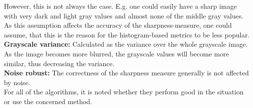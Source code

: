 However, this is not always the case. E.g. one could easily have a sharp image with very dark and light gray values and almost none of the middle gray values.\\
As this assumption affects the accuracy of the sharpness-measure, one could assume, that this is the reason for the histogram-based metrics to be less popular.\\
\textbf{Grayscale variance:} Calculated as the variance over the whole grayscale image. As the image becomes more blurred, the grayscale values will become more similar, thus decreasing the variance.\\
\textbf{Noise robust:}
The correctness of the sharpness measure generally is not affected by noise.\\

For all of the algorithms, it is noted whether they perform good in the situation or use the concerned method.
